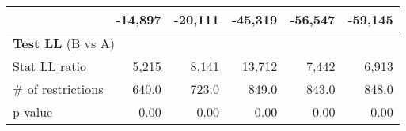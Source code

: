 \begin{tabular}{l|ccccc}
\multicolumn{1}{l}{\hspace{1em}{Model (B)}} &
  \multicolumn{1}{|r}{-14,897} &
  \multicolumn{1}{r}{-20,111} &
  \multicolumn{1}{r}{-45,319} &
  \multicolumn{1}{r}{-56,547} &
  \multicolumn{1}{r}{-59,145} \\ \hline
\multicolumn{6}{l}{\textbf{Test LL} (B vs A)}  \\
\multicolumn{1}{l}{\hspace{1em}Stat LL ratio } &
  \multicolumn{1}{|r}{5,215} &
  \multicolumn{1}{r}{8,141} &
  \multicolumn{1}{r}{13,712} &
  \multicolumn{1}{r}{7,442} &
  \multicolumn{1}{r}{6,913} \\
\multicolumn{1}{l}{\hspace{1em}$\#$ of restrictions} &
  \multicolumn{1}{|r}{640.0} &
  \multicolumn{1}{r}{723.0} &
  \multicolumn{1}{r}{849.0} &
  \multicolumn{1}{r}{843.0} &
  \multicolumn{1}{r}{848.0} \\
\multicolumn{1}{l}{\hspace{1em}p-value} &
  \multicolumn{1}{|r}{0.00} &
  \multicolumn{1}{r}{0.00} &
  \multicolumn{1}{r}{0.00} &
  \multicolumn{1}{r}{0.00} &
  \multicolumn{1}{r}{0.00} \\
\cline{1-6}
\end{tabular}

